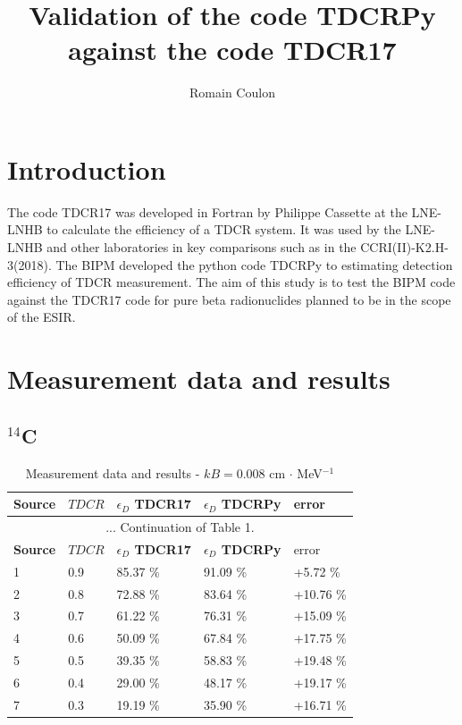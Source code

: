 \documentclass[12pt]{iopart}
\begin{document}
\title[Draft - May 2023]{Validation of the code TDCRPy against the code TDCR17}
\author{Romain Coulon}
\address{Bureau International des Poids et Mesures, Pavillon de Breteuil, F-92312 S\`{e}vres Cedex, France.}


\section{Introduction}

The code TDCR17 was developed in Fortran by Philippe Cassette at the LNE-LNHB to calculate the efficiency of a TDCR system. It was used by the LNE-LNHB and other laboratories in key comparisons such as in the CCRI(II)-K2.H-3(2018). The BIPM developed the python code TDCRPy to estimating detection efficiency of TDCR measurement. The aim of this study is to test the BIPM code against the TDCR17 code for pure beta radionuclides planned to be in the scope of the ESIR.\\

\tableofcontents

\pagebreak
\section{Measurement data and results}
\subsection{$^{14}$C}

\begingroup
\footnotesize
\begin{longtable}[l]{| p{} | p{} |p{} |p{} |p{} |} 
\caption{Measurement data and results - $kB = 0.008$ cm $\cdot$ MeV$^{-1}$}
\label{Table1} \\ 
\hline
\textbf{Source} & \textbf{$TDCR$} & \textbf{$\epsilon_{D}$ TDCR17} & \textbf{$\epsilon_{D}$ TDCRPy} & error \\
\endfirsthead
\multicolumn{5}{c}{... Continuation of Table 1.}\\ 
\hline
 \textbf{Source} & \textbf{$TDCR$} & \textbf{$\epsilon_{D}$ TDCR17} & \textbf{$\epsilon_{D}$ TDCRPy} & error \\   \hline 
\endhead
\hline
 1 & 0.9   &   85.37 \% &   91.09 \% &  +5.72 \% \\
 2 & 0.8   &   72.88 \% &   83.64 \% &  +10.76 \% \\
 3 & 0.7   &   61.22 \% &   76.31 \% &  +15.09 \% \\
 4 & 0.6   &   50.09 \% &   67.84 \% &  +17.75 \% \\
 5 & 0.5   &   39.35 \% &   58.83 \% &  +19.48 \% \\
 6 & 0.4   &   29.00 \% &   48.17 \% &  +19.17 \% \\
 7 & 0.3   &   19.19 \% &   35.90 \% &  +16.71 \% \\
\hline
\end{longtable} 
\endgroup
\end{document}
